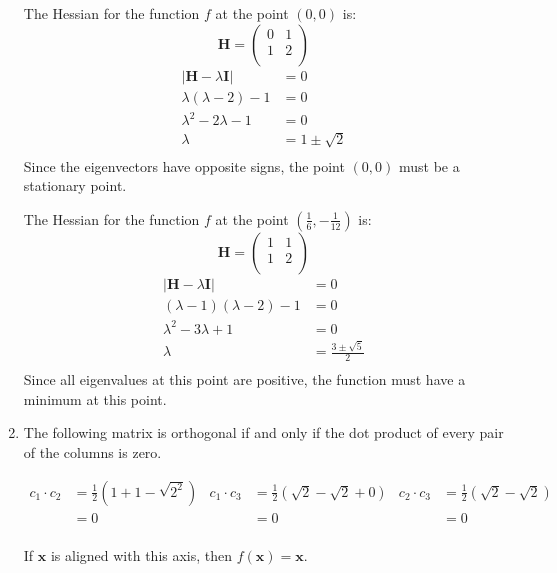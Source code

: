 \documentclass[10pt,oneside,a4paper]{article}
\begin{document}
\begin{enumerate}
The Hessian for the function $f$ at the point $(0, 0)$ is:
\[
\mathbf{H}
=
\begin{pmatrix}
0 & 1 \\
1 & 2 \\
\end{pmatrix}
\]
\[
\begin{split}
|\mathbf{H} - \lambda\mathbf{I}| &= 0 \\
\lambda(\lambda - 2) - 1 &= 0 \\
\lambda^2 - 2\lambda - 1 &= 0 \\
\lambda &= 1 \pm \sqrt {2} \\
\end{split}
\]
Since the eigenvectors have opposite signs, the point $(0, 0)$ must be a stationary point.

The Hessian for the function $f$ at the point $\left( \frac{1}{6}, -\frac{1}{12} \right)$ is:
\[
\mathbf{H}
=
\begin{pmatrix}
1 & 1 \\
1 & 2 \\
\end{pmatrix}
\]
\[
\begin{split}
|\mathbf{H} - \lambda\mathbf{I}| &= 0 \\
(\lambda - 1)(\lambda - 2) - 1 &= 0 \\
\lambda^2 - 3\lambda + 1 &= 0 \\
\lambda &= \frac{3 \pm \sqrt {5}}{2} \\
\end{split}
\]
Since all eigenvalues at this point are positive, the function must have a minimum at this point.

\item

The following matrix is orthogonal if and only if the dot product of every pair of the columns is zero.

\begin{align*}
c_1 \cdot c_2 &= \frac{1}{2}(1 + 1 - \sqrt {2^2}) & c_1 \cdot c_3 &= \frac{1}{2}(\sqrt {2} - \sqrt {2} + 0) & c_2
\cdot c_3 &= \frac{1}{2}(\sqrt {2} - \sqrt {2}) \\
&= 0 & &= 0 & &= 0 \\
\end{align*}

If $\mathbf{x}$ is aligned with this axis, then $f(\mathbf{x}) = \mathbf{x}$.


\end{enumerate}
\end{document}
